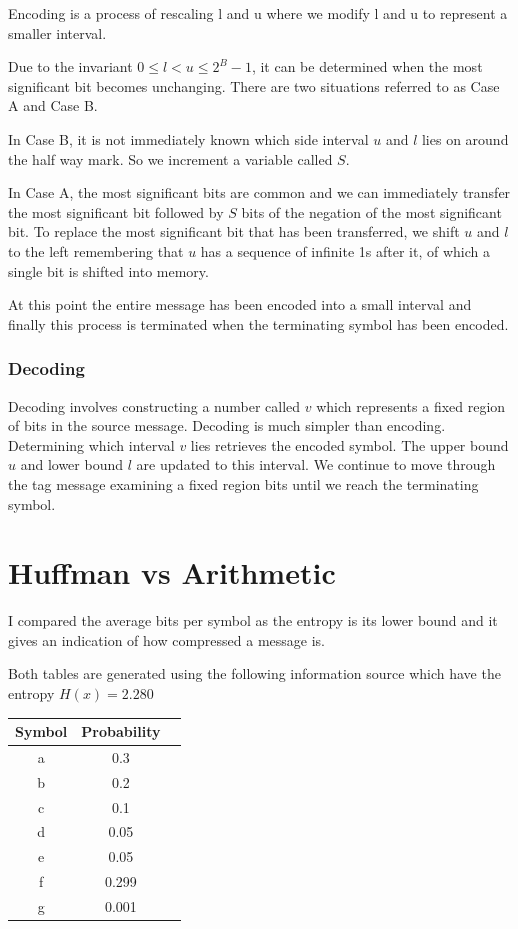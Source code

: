 \documentclass{article}
\begin{document}
Encoding is a process of rescaling l and u where we modify l and u to represent a smaller interval.

Due to the invariant $0 \leq l < u \leq 2^B-1$, it can be determined when the most significant bit becomes unchanging. There are two situations referred to as Case A and Case B.

In Case B, it is not immediately known which side interval $u$ and $l$ lies on around the half way mark. So we increment a variable called $S$.

In Case A, the most significant bits are common and we can immediately transfer the most significant bit followed by $S$ bits of the negation of the most significant bit. To replace the most significant bit that has been transferred, we shift $u$ and $l$ to the left remembering that $u$ has a sequence of infinite 1s after it, of which a single bit is shifted into memory.

At this point the entire message has been encoded into a small interval and finally this process is terminated when the terminating symbol has been encoded. 

\subsubsection{Decoding}

Decoding involves constructing a number called $v$ which represents a fixed region of bits in the source message. Decoding is much simpler than encoding. Determining which interval $v$ lies retrieves the encoded symbol. The upper bound $u$ and lower bound $l$ are updated to this interval. We continue to move through the tag message examining a fixed region bits until we reach the terminating symbol.

\section{Huffman vs Arithmetic}

I compared the average bits per symbol as the entropy is its lower bound and it gives an indication of how compressed a message is.

Both tables are generated using the following information source which have the entropy $H(x) = 2.280$

\begin{center}
  \begin{tabular}{ |c|c|c| } 
    \hline
    Symbol & Probability \\
    \hline
    a & 0.3 \\
    b & 0.2 \\
    c & 0.1 \\
    d & 0.05 \\
    e & 0.05 \\ 
    f & 0.299 \\
    g & 0.001 \\ 
    \hline
  \end{tabular}
\end{center}
\end{document}

